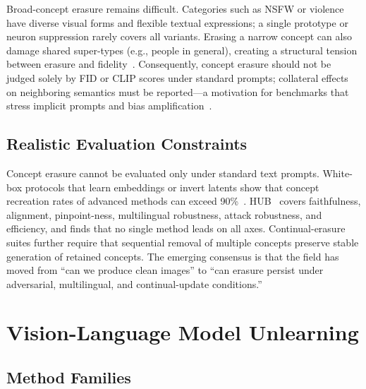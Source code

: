 \documentclass[10pt,twocolumn,letterpaper]{article}
\begin{document}
Broad-concept erasure remains difficult. Categories such as NSFW or violence have diverse visual forms and flexible textual expressions; a single prototype or neuron suppression rarely covers all variants. Erasing a narrow concept can also damage shared super-types (e.g., people in general), creating a structural tension between erasure and fidelity~\cite{safavigerdini2026}. Consequently, concept erasure should not be judged solely by FID or CLIP scores under standard prompts; collateral effects on neighboring semantics must be reported---a motivation for benchmarks that stress implicit prompts and bias amplification~\cite{moon2025hub}.

\subsection{Realistic Evaluation Constraints}

Concept erasure cannot be evaluated only under standard text prompts. White-box protocols that learn embeddings or invert latents show that concept recreation rates of advanced methods can exceed 90\%~\cite{moon2025hub,safavigerdini2026}. HUB~\cite{moon2025hub} covers faithfulness, alignment, pinpoint-ness, multilingual robustness, attack robustness, and efficiency, and finds that no single method leads on all axes. Continual-erasure suites further require that sequential removal of multiple concepts preserve stable generation of retained concepts. The emerging consensus is that the field has moved from ``can we produce clean images'' to ``can erasure persist under adversarial, multilingual, and continual-update conditions.''

\section{Vision-Language Model Unlearning}

\subsection{Method Families}
\end{document}
